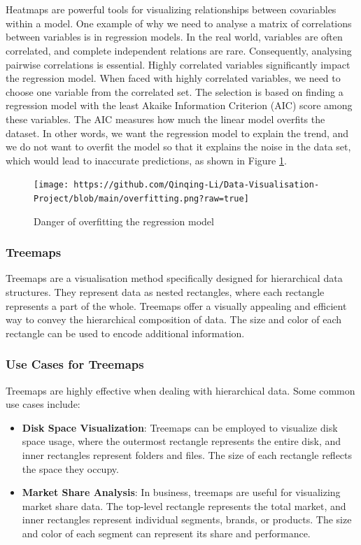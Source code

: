 \documentclass{article}\usepackage[]{graphicx}\usepackage[]{xcolor}
\begin{document}
\\  
\\Heatmaps are powerful tools for visualizing relationships between covariables within a model. One example of why we need to analyse a matrix of correlations between variables is in regression models. In the real world, variables are often correlated, and complete independent relations are rare. Consequently, analysing pairwise correlations is essential. Highly correlated variables significantly impact the regression model. When faced with highly correlated variables, we need to choose one variable from the correlated set. The selection is based on finding a regression model with the least Akaike Information Criterion (AIC) score among these variables. The AIC measures how much the linear model overfits the dataset. In other words, we want the regression model to explain the trend, and we do not want to overfit the model so that it explains the noise in the data set, which would lead to inaccurate predictions, as shown in Figure \ref{fig:noisy}.


\begin{figure}[h]
    \centering
    \texttt{[image: https://github.com/Qinqing-Li/Data-Visualisation-Project/blob/main/overfitting.png?raw=true]}
    \caption{Danger of overfitting the regression model}
    \label{fig:noisy}
\end{figure}

\subsubsection{Treemaps}
Treemaps are a visualisation method specifically designed for hierarchical data structures. They represent data as nested rectangles, where each rectangle represents a part of the whole. Treemaps offer a visually appealing and efficient way to convey the hierarchical composition of data. The size and color of each rectangle can be used to encode additional information.

\subsubsection{Use Cases for Treemaps}
Treemaps are highly effective when dealing with hierarchical data. Some common use cases include:
\begin{itemize}
\item \textbf{Disk Space Visualization}: Treemaps can be employed to visualize disk space usage, where the outermost rectangle represents the entire disk, and inner rectangles represent folders and files. The size of each rectangle reflects the space they occupy.
\item \textbf{Market Share Analysis}: In business, treemaps are useful for visualizing market share data. The top-level rectangle represents the total market, and inner rectangles represent individual segments, brands, or products. The size and color of each segment can represent its share and performance.
\end{itemize}
\end{document}
